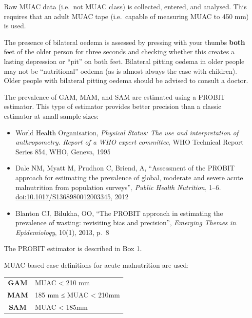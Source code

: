 \documentclass[12pt,a4paper]{book}
\begin{document}
Raw MUAC data (i.e.~not MUAC class) is collected, entered, and analysed. This requires that an adult MUAC tape (i.e.~capable of measuring MUAC to 450 mm) is used.

The presence of bilateral oedema is assessed by pressing with your thumbs \textbf{both} feet of the older person for three seconds and checking whether this creates a lasting depression or ``pit'' on both feet. Bilateral pitting oedema in older people may not be ``nutritional'' oedema (as is almost always the case with children). Older people with bilateral pitting oedema should be advised to consult a doctor.

The prevalence of GAM, MAM, and SAM are estimated using a PROBIT estimator. This type of estimator provides better precision than a classic estimator at small sample sizes:

\begin{itemize}
\item
  World Health Organisation, \emph{Physical Status: The use and interpretation of anthropometry. Report of a WHO expert committee}, WHO Technical Report Series 854, WHO, Geneva, 1995
\item
  Dale NM, Myatt M, Prudhon C, Briend, A, ``Assessment of the PROBIT approach for estimating the prevalence of global, moderate and severe acute malnutrition from population surveys'', \emph{Public Health Nutrition}, 1--6. \url{doi:10.1017/S1368980012003345}, 2012
\item
  Blanton CJ, Bilukha, OO, ``The PROBIT approach in estimating the prevalence of wasting: revisiting bias and precision'', \emph{Emerging Themes in Epidemiology}, 10(1), 2013, p.~8
\end{itemize}

The PROBIT estimator is described in Box 1.

MUAC-based case definitions for acute malnutrition are used:

\begin{longtable}[]{@{}cl@{}}
\toprule
\endhead
\begin{minipage}[t]{0.14\columnwidth}\centering
\textbf{GAM}\strut
\end{minipage} & \begin{minipage}[t]{0.31\columnwidth}\raggedright
MUAC \textless{} 210 mm\strut
\end{minipage}\tabularnewline
\begin{minipage}[t]{0.14\columnwidth}\centering
\textbf{MAM}\strut
\end{minipage} & \begin{minipage}[t]{0.31\columnwidth}\raggedright
185 mm ≤ MUAC \textless{} 210mm\strut
\end{minipage}\tabularnewline
\begin{minipage}[t]{0.14\columnwidth}\centering
\textbf{SAM}\strut
\end{minipage} & \begin{minipage}[t]{0.31\columnwidth}\raggedright
MUAC \textless{} 185mm\strut
\end{minipage}\tabularnewline
\bottomrule
\end{longtable}
\end{document}
